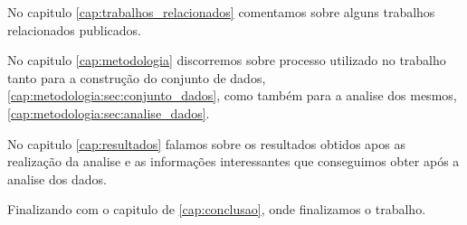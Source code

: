 No capitulo \ref{cap:trabalhos_relacionados} comentamos sobre alguns trabalhos relacionados publicados.

No capitulo \ref{cap:metodologia} discorremos sobre processo utilizado no trabalho tanto para a construção do conjunto de dados, \ref{cap:metodologia:sec:conjunto_dados}, como também para a analise dos mesmos, \ref{cap:metodologia:sec:analise_dados}.

No capitulo \ref{cap:resultados} falamos sobre os resultados obtidos apos as realização da analise e as informações interessantes que conseguimos obter após a analise dos dados.

Finalizando com o capitulo de \ref{cap:conclusao}, onde finalizamos o trabalho.
